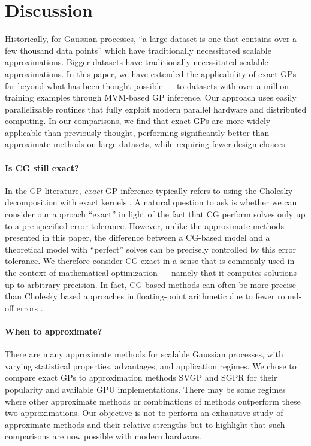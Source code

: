 \section{Discussion}

Historically, for Gaussian processes, ``a large dataset is one that contains over a few thousand data points'' \citep{hensman2013gaussian} which have traditionally necessitated scalable approximations.
Bigger datasets have traditionally necessitated
scalable approximations. In this paper, we have extended
the applicability of exact GPs far beyond what has been
thought possible --- to datasets with over a million training examples through MVM-based GP inference. Our
approach uses easily parallelizable routines that fully exploit modern parallel hardware and distributed computing. In our comparisons, we find that exact GPs are more
widely applicable than previously thought, performing significantly 
better than approximate methods on large datasets, while requiring fewer design choices.

\paragraph{Is CG still exact?}
In the GP literature, \emph{exact} GP inference typically refers to using the Cholesky decomposition with exact kernels \citep{rasmussen2006gaussian}.
A natural question to ask is whether we can consider our approach ``exact'' in light of the fact that CG perform solves only up to a pre-specified error tolerance.
However, unlike the approximate methods presented in this paper, the difference between a CG-based model and a theoretical model with ``perfect'' solves can be precisely controlled by this error tolerance.
We therefore consider CG exact in a sense that is commonly used in the context of mathematical optimization --- namely that it computes solutions up to arbitrary precision.
In fact, CG-based methods can often be more precise than Cholesky based approaches in floating-point arithmetic due to fewer round-off errors \cite{gardner2018gpytorch}.

\paragraph{When to approximate?}
There are many approximate methods for scalable Gaussian
processes, with varying statistical properties, advantages, and application regimes.
We chose to compare exact GPs to approximation methods SVGP and SGPR for their
popularity and available GPU implementations. There may be some regimes where other
approximate methods or combinations of methods outperform these two approximations.
Our objective is not to perform an exhaustive study of approximate methods and
their relative strengths but to highlight that such comparisons are now possible with modern hardware.

